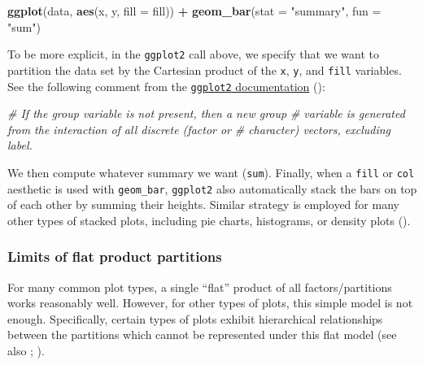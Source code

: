 \documentclass[
]{book}
\newenvironment{Shaded}{\begin{snugshade}}{\end{snugshade}}
\newcommand{\AttributeTok}[1]{\textcolor[rgb]{0.13,0.29,0.53}{#1}}
\newcommand{\CommentTok}[1]{\textcolor[rgb]{0.56,0.35,0.01}{\textit{#1}}}
\newcommand{\FunctionTok}[1]{\textcolor[rgb]{0.13,0.29,0.53}{\textbf{#1}}}
\newcommand{\NormalTok}[1]{#1}
\newcommand{\SpecialCharTok}[1]{\textcolor[rgb]{0.81,0.36,0.00}{\textbf{#1}}}
\newcommand{\StringTok}[1]{\textcolor[rgb]{0.31,0.60,0.02}{#1}}
\theoremstyle{definition}
\theoremstyle{definition}
\theoremstyle{definition}
\theoremstyle{definition}
\theoremstyle{remark}
\begin{document}
\begin{Shaded}
\begin{Highlighting}[]
\FunctionTok{ggplot}\NormalTok{(data, }\FunctionTok{aes}\NormalTok{(x, y, }\AttributeTok{fill =}\NormalTok{ fill)) }\SpecialCharTok{+}
  \FunctionTok{geom\_bar}\NormalTok{(}\AttributeTok{stat =} \StringTok{"summary"}\NormalTok{, }\AttributeTok{fun =} \StringTok{"sum"}\NormalTok{)}
\end{Highlighting}
\end{Shaded}

To be more explicit, in the \texttt{ggplot2} call above, we specify that we want to partition the data set by the Cartesian product of the \texttt{x}, \texttt{y}, and \texttt{fill} variables. See the following comment from the \href{https://github.com/tidyverse/ggplot2/blob/f46805349d6ca8ca7a99f8966cfa0f29279c2f6c/R/grouping.R\#L7}{\texttt{ggplot2} documentation} ():

\begin{Shaded}
\begin{Highlighting}[]
\CommentTok{\# If the \textasciigrave{}group\textasciigrave{} variable is not present, then a new group}
\CommentTok{\# variable is generated from the interaction of all discrete (factor or}
\CommentTok{\# character) vectors, excluding \textasciigrave{}label\textasciigrave{}.}
\end{Highlighting}
\end{Shaded}

We then compute whatever summary we want (\texttt{sum}). Finally, when a \texttt{fill} or \texttt{col} aesthetic is used with \texttt{geom\_bar}, \texttt{ggplot2} also automatically stack the bars on top of each other by summing their heights. Similar strategy is employed for many other types of stacked plots, including pie charts, histograms, or density plots ().

\subsubsection{Limits of flat product partitions}\label{limits-of-flat-product-partitions}

For many common plot types, a single ``flat'' product of all factors/partitions works reasonably well. However, for other types of plots, this simple model is not enough. Specifically, certain types of plots exhibit hierarchical relationships between the partitions which cannot be represented under this flat model (see also ; ).
\end{document}
